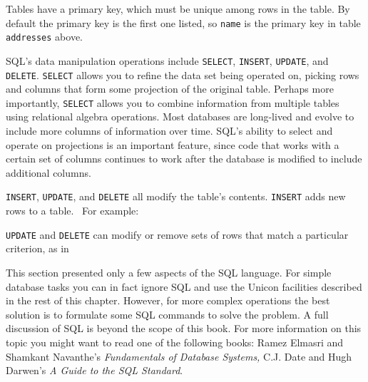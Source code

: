 Tables have a primary key, which must be unique among rows in the table.
By default the primary key is the first one listed, so \texttt{name} is
the primary key in table \texttt{addresses} above.

SQL's data manipulation operations include
\texttt{SELECT}, \texttt{INSERT}, \texttt{UPDATE}, and \texttt{DELETE}.
\texttt{SELECT} allows you to refine the data set being operated on,
picking rows and columns that form some projection of the original
table. Perhaps more importantly, \texttt{SELECT} allows you to combine
information from multiple tables using relational algebra operations.
Most databases are long-lived and evolve to include more columns of
information over time. SQL's ability to select and
operate on projections is an important feature, since code that works
with a certain set of columns continues to work after the database is
modified to include additional columns.

\texttt{INSERT}, \texttt{UPDATE}, and \texttt{DELETE} all modify the
table's contents. \texttt{INSERT} adds new rows to a
table. \ For example:


\texttt{UPDATE} and \texttt{DELETE} can modify or remove sets of rows
that match a particular criterion, as in


This section presented only a few aspects of the SQL language. For
simple database tasks you can in fact ignore SQL and use the Unicon
facilities described in the rest of this chapter. However, for more
complex operations the best solution is to formulate some SQL commands
to solve the problem. A full discussion of SQL is beyond the scope of
this book. For more information on this topic you might want to read
one of the following books: Ramez Elmasri and Shamkant
Navanthe's \textit{Fundamentals of Database Systems,}
C.J. Date and Hugh Darwen's \textit{A Guide to the SQL
Standard}.

